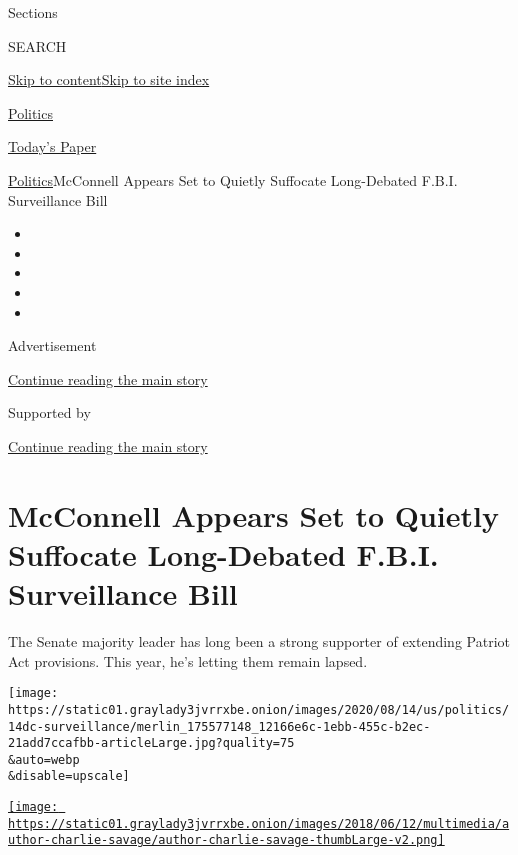 Sections

SEARCH

\protect\hyperlink{site-content}{Skip to
content}\protect\hyperlink{site-index}{Skip to site index}

\href{https://www.nytimes3xbfgragh.onion/section/politics}{Politics}

\href{https://myaccount.nytimes3xbfgragh.onion/auth/login?response_type=cookie\&client_id=vi}{}

\href{https://www.nytimes3xbfgragh.onion/section/todayspaper}{Today's
Paper}

\href{/section/politics}{Politics}\textbar{}McConnell Appears Set to
Quietly Suffocate Long-Debated F.B.I. Surveillance Bill

\begin{itemize}
\item
\item
\item
\item
\item
\end{itemize}

Advertisement

\protect\hyperlink{after-top}{Continue reading the main story}

Supported by

\protect\hyperlink{after-sponsor}{Continue reading the main story}

\hypertarget{mcconnell-appears-set-to-quietly-suffocate-long-debated-fbi-surveillance-bill}{%
\section{McConnell Appears Set to Quietly Suffocate Long-Debated F.B.I.
Surveillance
Bill}\label{mcconnell-appears-set-to-quietly-suffocate-long-debated-fbi-surveillance-bill}}

The Senate majority leader has long been a strong supporter of extending
Patriot Act provisions. This year, he's letting them remain lapsed.

\texttt{[image: https://static01.graylady3jvrrxbe.onion/images/2020/08/14/us/politics/14dc-surveillance/merlin\_175577148\_12166e6c-1ebb-455c-b2ec-21add7ccafbb-articleLarge.jpg?quality=75\\\&auto=webp\\\&disable=upscale]}

\href{https://www.nytimes3xbfgragh.onion/by/charlie-savage}{\texttt{[image: https://static01.graylady3jvrrxbe.onion/images/2018/06/12/multimedia/author-charlie-savage/author-charlie-savage-thumbLarge-v2.png]}}

